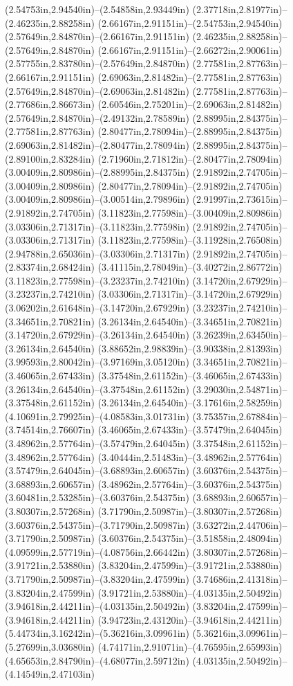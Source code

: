 (2.54753in,2.94540in)--(2.54858in,2.93449in) (2.37718in,2.81977in)--(2.46235in,2.88258in) (2.66167in,2.91151in)--(2.54753in,2.94540in) (2.57649in,2.84870in)--(2.66167in,2.91151in) (2.46235in,2.88258in)--(2.57649in,2.84870in) (2.66167in,2.91151in)--(2.66272in,2.90061in) (2.57755in,2.83780in)--(2.57649in,2.84870in) (2.77581in,2.87763in)--(2.66167in,2.91151in) (2.69063in,2.81482in)--(2.77581in,2.87763in) (2.57649in,2.84870in)--(2.69063in,2.81482in) (2.77581in,2.87763in)--(2.77686in,2.86673in) (2.60546in,2.75201in)--(2.69063in,2.81482in) (2.57649in,2.84870in)--(2.49132in,2.78589in) (2.88995in,2.84375in)--(2.77581in,2.87763in) (2.80477in,2.78094in)--(2.88995in,2.84375in) (2.69063in,2.81482in)--(2.80477in,2.78094in) (2.88995in,2.84375in)--(2.89100in,2.83284in) (2.71960in,2.71812in)--(2.80477in,2.78094in) (3.00409in,2.80986in)--(2.88995in,2.84375in) (2.91892in,2.74705in)--(3.00409in,2.80986in) (2.80477in,2.78094in)--(2.91892in,2.74705in) (3.00409in,2.80986in)--(3.00514in,2.79896in) (2.91997in,2.73615in)--(2.91892in,2.74705in) (3.11823in,2.77598in)--(3.00409in,2.80986in) (3.03306in,2.71317in)--(3.11823in,2.77598in) (2.91892in,2.74705in)--(3.03306in,2.71317in) (3.11823in,2.77598in)--(3.11928in,2.76508in) (2.94788in,2.65036in)--(3.03306in,2.71317in) (2.91892in,2.74705in)--(2.83374in,2.68424in) (3.41115in,2.78049in)--(3.40272in,2.86772in) (3.11823in,2.77598in)--(3.23237in,2.74210in) (3.14720in,2.67929in)--(3.23237in,2.74210in) (3.03306in,2.71317in)--(3.14720in,2.67929in) (3.06202in,2.61648in)--(3.14720in,2.67929in) (3.23237in,2.74210in)--(3.34651in,2.70821in) (3.26134in,2.64540in)--(3.34651in,2.70821in) (3.14720in,2.67929in)--(3.26134in,2.64540in) (3.26239in,2.63450in)--(3.26134in,2.64540in) (3.88652in,2.98839in)--(3.90338in,2.81393in) (3.99593in,2.80042in)--(3.97169in,3.05120in) (3.34651in,2.70821in)--(3.46065in,2.67433in) (3.37548in,2.61152in)--(3.46065in,2.67433in) (3.26134in,2.64540in)--(3.37548in,2.61152in) (3.29030in,2.54871in)--(3.37548in,2.61152in) (3.26134in,2.64540in)--(3.17616in,2.58259in) (4.10691in,2.79925in)--(4.08583in,3.01731in) (3.75357in,2.67884in)--(3.74514in,2.76607in) (3.46065in,2.67433in)--(3.57479in,2.64045in) (3.48962in,2.57764in)--(3.57479in,2.64045in) (3.37548in,2.61152in)--(3.48962in,2.57764in) (3.40444in,2.51483in)--(3.48962in,2.57764in) (3.57479in,2.64045in)--(3.68893in,2.60657in) (3.60376in,2.54375in)--(3.68893in,2.60657in) (3.48962in,2.57764in)--(3.60376in,2.54375in) (3.60481in,2.53285in)--(3.60376in,2.54375in) (3.68893in,2.60657in)--(3.80307in,2.57268in) (3.71790in,2.50987in)--(3.80307in,2.57268in) (3.60376in,2.54375in)--(3.71790in,2.50987in) (3.63272in,2.44706in)--(3.71790in,2.50987in) (3.60376in,2.54375in)--(3.51858in,2.48094in) (4.09599in,2.57719in)--(4.08756in,2.66442in) (3.80307in,2.57268in)--(3.91721in,2.53880in) (3.83204in,2.47599in)--(3.91721in,2.53880in) (3.71790in,2.50987in)--(3.83204in,2.47599in) (3.74686in,2.41318in)--(3.83204in,2.47599in) (3.91721in,2.53880in)--(4.03135in,2.50492in) (3.94618in,2.44211in)--(4.03135in,2.50492in) (3.83204in,2.47599in)--(3.94618in,2.44211in) (3.94723in,2.43120in)--(3.94618in,2.44211in) (5.44734in,3.16242in)--(5.36216in,3.09961in) (5.36216in,3.09961in)--(5.27699in,3.03680in) (4.74171in,2.91071in)--(4.76595in,2.65993in) (4.65653in,2.84790in)--(4.68077in,2.59712in) (4.03135in,2.50492in)--(4.14549in,2.47103in) 